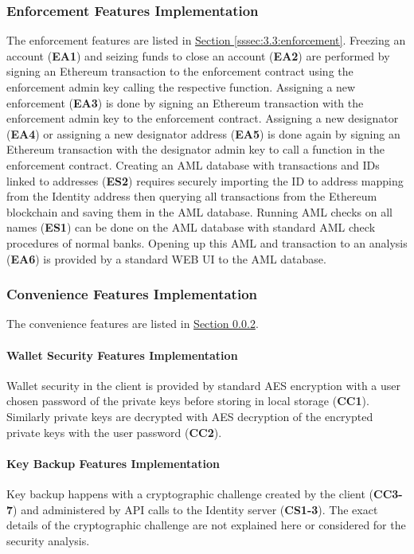 \documentclass[a4paper,12pt]{article} %
\newcommand{\hypersectionref}[1]{\hyperref[#1]{Section \ref{#1}}}
\begin{document}
{\subsubsection{Enforcement Features Implementation} \label{sssec:3.6:enforcement}

The enforcement features are listed in \hypersectionref{sssec:3.3:enforcement}. Freezing an account (\textbf{EA1}) and seizing funds to close an account (\textbf{EA2}) are performed by signing an Ethereum transaction to the enforcement contract using the enforcement admin key calling the respective function. Assigning a new enforcement (\textbf{EA3}) is done by signing an Ethereum transaction with the enforcement admin key to the enforcement contract. Assigning a new designator (\textbf{EA4}) or assigning a new designator address (\textbf{EA5}) is done again by signing an Ethereum transaction with the designator admin key to call a function in the enforcement contract. Creating an AML database with transactions and IDs linked to addresses (\textbf{ES2}) requires securely importing the ID to address mapping from the Identity address then querying all transactions from the Ethereum blockchain and saving them in the AML database. Running AML checks on all names (\textbf{ES1}) can be done on the AML database with standard AML check procedures of normal banks. Opening up this AML and transaction to an analysis (\textbf{EA6}) is provided by a standard WEB UI to the AML database.

\subsubsection{Convenience Features Implementation} \label{sssec:3.3:convenience}

The convenience features are listed in \hypersectionref{sssec:3.3:convenience}.

\paragraph*{Wallet Security Features Implementation}
Wallet security in the client is provided by standard AES encryption with a user chosen password of the private keys before storing in local storage (\textbf{CC1}). Similarly private keys are decrypted with AES decryption of the encrypted private keys with the user password (\textbf{CC2}).

\paragraph*{Key Backup Features Implementation}
Key backup happens with a cryptographic challenge created by the client (\textbf{CC3-7}) and administered by API calls to the Identity server (\textbf{CS1-3}). The exact details of the cryptographic challenge are not explained here or considered for the security analysis.

}
\end{document}
